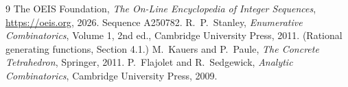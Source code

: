 \documentclass[11pt,a4paper]{article}
\theoremstyle{plain}
\theoremstyle{definition}
\begin{document}
\begin{thebibliography}{9}
 The OEIS Foundation, \emph{The On-Line Encyclopedia of Integer
Sequences}, \url{https://oeis.org}, 2026. Sequence A250782.
 R.~P.~Stanley, \emph{Enumerative Combinatorics}, Volume 1, 2nd ed.,
Cambridge University Press, 2011. (Rational generating functions, Section 4.1.)
 M.~Kauers and P.~Paule, \emph{The Concrete Tetrahedron}, Springer, 2011.
 P.~Flajolet and R.~Sedgewick, \emph{Analytic Combinatorics}, Cambridge
University Press, 2009.
\end{thebibliography}
\end{document}
